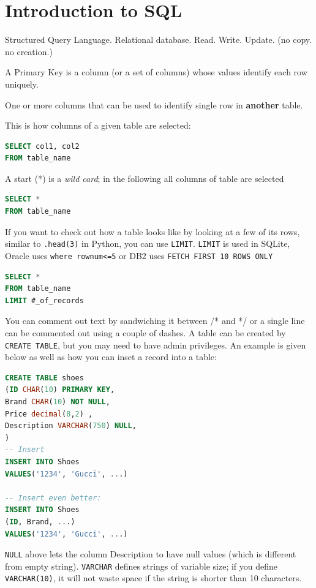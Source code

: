 
\section{Introduction to SQL}
\label{sec:IntroductiontoSQL}
Structured Query Language. Relational database.
Read. Write. Update. (no copy. no creation.)


\begin{deff}
A Primary Key is a column (or a set of columns) whose values identify each row uniquely.
\end{deff}

\begin{deff}
One or more columns that can be used to identify
single row in {\bf another} table.
\end{deff}

This is how columns of a given table are selected:
\begin{lstlisting}[language=SQL]
SELECT col1, col2
FROM table_name
\end{lstlisting}

A start (*) is a \emph{wild card}; in the following all columns of table
are selected
\begin{lstlisting}[language=SQL]
SELECT *
FROM table_name
\end{lstlisting}

If you want to check out how a table looks like
by looking at a few of its rows, similar to \texttt{.head(3)} in Python, you 
can use \texttt{LIMIT}. 
 \texttt{LIMIT} is used in SQLite, Oracle uses  \texttt{where rownum<=5}
 or DB2 uses  \texttt{FETCH FIRST 10 ROWS ONLY}
\begin{lstlisting}[language=SQL]
SELECT *
FROM table_name
LIMIT #_of_records
\end{lstlisting}

You can comment out text by sandwiching it between /* and */ or a single line
can be commented out using a couple of dashes.
A table can be created by \texttt{CREATE TABLE}, but you may need
to have admin privileges. An example is given below as well as how you can
inset a record into a table:

\begin{lstlisting}[language=SQL]
CREATE TABLE shoes
(ID CHAR(10) PRIMARY KEY,
Brand CHAR(10) NOT NULL,
Price decimal(8,2) ,
Description VARCHAR(750) NULL,
)
-- Insert
INSERT INTO Shoes
VALUES('1234', 'Gucci', ...)

-- Insert even better:
INSERT INTO Shoes
(ID, Brand, ...)
VALUES('1234', 'Gucci', ...)

\end{lstlisting}
\texttt{NULL} above lets the column Description to have null values (which is different from empty string).
\texttt{VARCHAR} defines strings of variable size; if you define \texttt{VARCHAR(10)}, it will not waste
space if the string is shorter than 10 characters.


